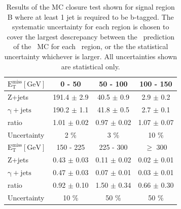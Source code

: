\begin{table}[htb]
  \scriptsize
  \begin{center}
    \caption{\label{tab:template_systematics_withb_SRB} 
      Results of the MC closure test shown for signal region B where at least 1 jet is required to be b-tagged.
      The systematic uncertainty for each region is chosen to cover the largest descrepancy between the \gjets\ prediction of the \zjets\ MC for each \MET\ region,
      or the the statistical uncertainty whichever is larger. 
      All uncertainties shown are statistical only. 
    }
    \begin{tabular}{l|c|c|c}
      \hline
      \hline
      $\mathrm{E_{T}^{miss} [GeV]}$ &0 - 50 & 50 - 100 & 100 - 150 \\
      \hline 
      Z+jets&  191.4 $\pm$ 2.9 &  40.5 $\pm$ 0.9 &  2.9 $\pm$ 0.2 \\ 
      $\mathrm{\gamma+jets}$&  190.2 $\pm$ 1.1 &  41.8 $\pm$ 0.5 &  2.7 $\pm$ 0.1 \\ 
      \hline
      ratio&  1.01 $\pm$ 0.02 &  0.97 $\pm$ 0.02 &  1.07 $\pm$ 0.07 \\ 
      \hline
      Uncertainty & 2 \%              & 3 \%              & 10 \%   \\
      \hline
      \hline
      $\mathrm{E_{T}^{miss} [GeV]}$ &150 - 225 & 225 - 300 & $\geq$ 300 \\
      \hline 
      Z+jets&  0.43 $\pm$ 0.03 &  0.11 $\pm$ 0.02 &  0.02 $\pm$ 0.01 \\ 
      $\mathrm{\gamma+jets}$&  0.47 $\pm$ 0.03 &  0.07 $\pm$ 0.01 &  0.03 $\pm$ 0.01 \\ 
      \hline
      ratio&  0.92 $\pm$ 0.10 &  1.50 $\pm$ 0.34 &  0.66 $\pm$ 0.30 \\ 
      \hline
      Uncertainty & 10 \%              & 50 \%              & 50 \%  \\
      \hline
      \hline
    \end{tabular}
  \end{center}
\end{table}

